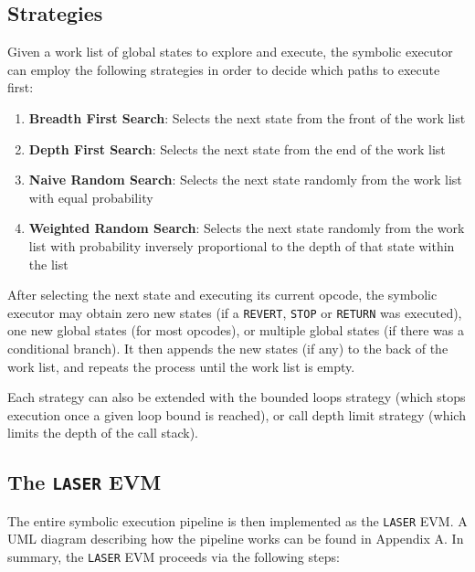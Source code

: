 \subsection{Strategies}

Given a work list of global states to explore and execute, the symbolic executor can employ the following strategies
in order to decide which paths to execute first:

\begin{enumerate}
    \item \textbf{Breadth First Search}: 
    Selects the next state from the front of the work list
    

    \item \textbf{Depth First Search}: 
    Selects the next state from the end of the work list

    \item \textbf{Naive Random Search}: 
    Selects the next state randomly from the work list with equal probability

    \item \textbf{Weighted Random Search}: 
    Selects the next state randomly from the work list with probability inversely proportional to
    the depth of that state within the list
\end{enumerate}

After selecting the next state and executing its current opcode, the symbolic executor may obtain 
zero new states (if a \texttt{REVERT}, \texttt{STOP} or \texttt{RETURN} was executed), one new global states (for most opcodes), 
or multiple global states (if there was a conditional branch). It then appends the new states (if any) to the back 
of the work list, and repeats the process until the work list is empty.

Each strategy can also be extended with the bounded loops strategy (which stops execution once a given 
loop bound is reached), or call depth limit strategy (which limits the depth of the call stack).

\subsection{The \texttt{LASER} EVM}

The entire symbolic execution pipeline is then implemented as the \texttt{LASER} EVM. A UML diagram describing
how the pipeline works can be found in Appendix A. In summary, the \texttt{LASER} EVM proceeds via the
following steps:

